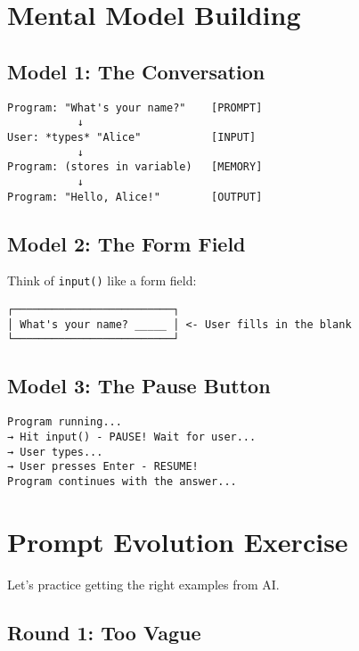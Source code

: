 \documentclass[
  letterpaper,
  DIV=11,
  numbers=noendperiod,
  oneside]{scrreprt}
\begin{document}
\section{Mental Model Building}\label{mental-model-building-2}

\subsection{Model 1: The Conversation}\label{model-1-the-conversation}

\begin{verbatim}
Program: "What's your name?"    [PROMPT]
           ↓
User: *types* "Alice"           [INPUT]
           ↓
Program: (stores in variable)   [MEMORY]
           ↓
Program: "Hello, Alice!"        [OUTPUT]
\end{verbatim}

\subsection{Model 2: The Form Field}\label{model-2-the-form-field}

Think of \texttt{input()} like a form field:

\begin{verbatim}
┌─────────────────────────┐
│ What's your name? _____ │ <- User fills in the blank
└─────────────────────────┘
\end{verbatim}

\subsection{Model 3: The Pause Button}\label{model-3-the-pause-button}

\begin{verbatim}
Program running...
→ Hit input() - PAUSE! Wait for user...
→ User types...
→ User presses Enter - RESUME!
Program continues with the answer...
\end{verbatim}

\section{Prompt Evolution Exercise}\label{prompt-evolution-exercise-2}

Let's practice getting the right examples from AI.

\subsection{Round 1: Too Vague}\label{round-1-too-vague-2}
\end{document}

